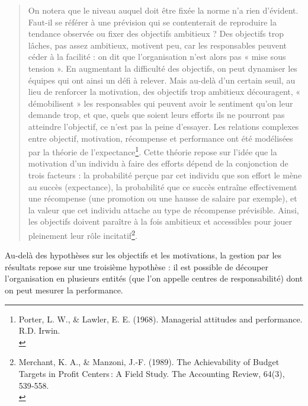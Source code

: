 \documentclass{kaobook}
\begin{document}
\begin{quote}
On notera que le niveau auquel doit être fixée la norme n’a rien d’évident. Faut-il se référer à une prévision qui se contenterait de reproduire la tendance observée ou fixer des objectifs ambitieux ? Des objectifs trop lâches, pas assez ambitieux, motivent peu, car les responsables peuvent céder à la facilité : on dit que l’organisation n’est alors pas « mise sous tension ». En augmentant la difficulté des objectifs, on peut dynamiser les équipes qui ont ainsi un défi à relever. Mais au-delà d’un certain seuil, au lieu de renforcer la motivation, des objectifs trop ambitieux découragent, « démobilisent » les responsables qui peuvent avoir le sentiment qu’on leur demande trop, et que, quels que soient leurs efforts ils ne pourront pas atteindre l’objectif, ce n’est pas la peine d’essayer. Les relations complexes entre objectif, motivation, récompense et performance ont été modélisées par la théorie de l’expectance\footnote{Porter, L. W., \& Lawler, E. E. (1968). Managerial attitudes and performance. R.D. Irwin.\\}. Cette théorie repose sur l’idée que la motivation d’un individu à faire des efforts dépend de la conjonction de trois facteurs : la probabilité perçue par cet individu que son effort le mène au succès (expectance), la probabilité que ce succès entraîne effectivement une récompense (une promotion ou une hausse de salaire par exemple), et la valeur que cet individu attache au type de récompense prévisible. Ainsi, les objectifs doivent paraître à la fois ambitieux et accessibles pour jouer pleinement leur rôle incitatif\footnote{Merchant, K. A., \& Manzoni, J.-F. (1989). The Achievability of Budget Targets in Profit Centers : A Field Study. The Accounting Review, 64(3), 539‑558.\\}.\\
\end{quote}

Au-delà des hypothèses sur les objectifs et les motivations, la gestion par les résultats repose sur une troisième hypothèse : il est possible de découper l'organisation en plusieurs entités (que l'on appelle centres de responsabilité) dont on peut mesurer la performance.\\
\end{document}
